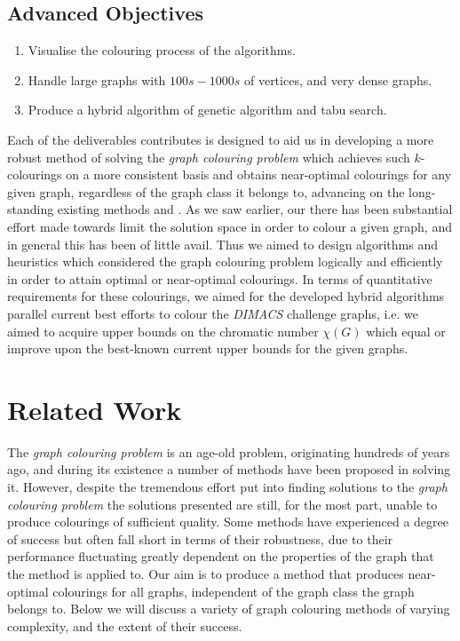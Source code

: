 \documentclass[12pt,a4paper]{article}
\begin{document}
\subsection*{Advanced Objectives}
\begin{enumerate}[label = \textbf{A\arabic*}]
\itemsep0em
\item Visualise the colouring process of the algorithms. \label{obj:A1}
\item Handle large graphs with $100s - 1000s$ of vertices, and very dense graphs. \label{obj:A2}
\item Produce a hybrid algorithm of genetic algorithm and tabu search. \label{obj:A3}
\end{enumerate}

\par Each of the deliverables contributes is designed to aid us in developing a more robust method of solving the \textit{graph colouring problem} which achieves such $k$-colourings on a more consistent basis and obtains near-optimal colourings for any given graph, regardless of the graph class it belongs to, advancing on the long-standing existing methods \cite{Hao} and \cite{Sousa}. As we saw earlier, our there has been substantial effort made towards limit the solution space in order to colour a given graph, and in general this has been of little avail. Thus we aimed to design algorithms and heuristics which considered the graph colouring problem logically and efficiently in order to attain optimal or near-optimal colourings. In terms of quantitative requirements for these colourings, we aimed for the developed hybrid algorithms parallel current best efforts to colour the \textit{DIMACS} challenge graphs, i.e. we aimed to acquire upper bounds on the chromatic number $\chi(G)$ which equal or improve upon the best-known current upper bounds for the given graphs. 


 


\section{Related Work}
\par The \textit{graph colouring problem} is an age-old problem, originating hundreds of years ago, and during its existence a number of methods have been proposed in solving it. However, despite the tremendous effort put into finding solutions to the \textit{graph colouring problem} the solutions presented are still, for the most part, unable to produce colourings of sufficient quality. Some methods have experienced a degree of success but often fall short in terms of their robustness, due to their performance fluctuating greatly dependent on the properties of the graph that the method is applied to. Our aim is to produce a method that produces near-optimal colourings for all graphs, independent of the graph class the graph belongs to. Below we will discuss a variety of graph colouring methods of varying complexity, and the extent of their success.
\end{document}
